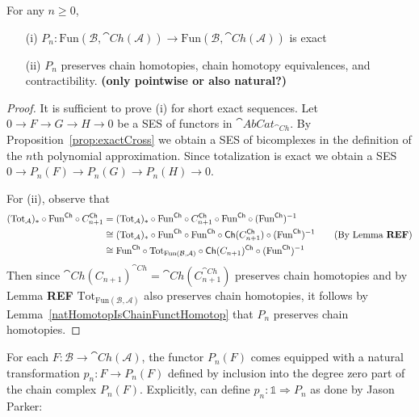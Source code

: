 \begin{prop}[label=prop:exactPol]
    For any $n \geq 0$,
    \begin{itemize}
        \item[(i)] $P_n:\text{Fun}(\mathcal{B},\cat{Ch}(\mathcal{A}))\rightarrow \text{Fun}(\mathcal{B},\cat{Ch}(\mathcal{A}))$ is exact
        \item[(ii)] $P_n$ preserves chain homotopies, chain homotopy equivalences, and contractibility. \textbf{(only pointwise or also natural?)}
    \end{itemize}
\end{prop}
\begin{proof}
    It is sufficient to prove (i) for short exact sequences. Let $0 \rightarrow F\rightarrow G\rightarrow H\rightarrow 0$ be a SES of functors in $\cat{AbCat}_{\cat{Ch}}$. By Proposition~\ref{prop:exactCross} we obtain a SES of bicomplexes in the definition of the $n$th polynomial approximation. Since totalization is exact we obtain a SES $0 \rightarrow P_n(F)\rightarrow P_n(G)\rightarrow P_n(H)\rightarrow 0$. 
    
    \vspace{10pt}
    
    For (ii), observe that
    \begin{align*}
        (\text{Tot}_{\mathcal{A}})_*\circ \text{Fun}^{\cat{Ch}}\circ C_{n+1}^{\cat{Ch}} &= (\text{Tot}_{\mathcal{A}})_*\circ \text{Fun}^{\cat{Ch}}\circ C_{n+1}^{\cat{Ch}} \circ \text{Fun}^{\cat{Ch}} \circ (\text{Fun}^{\cat{Ch}})^{-1} \\
        &\cong (\text{Tot}_{\mathcal{A}})_*\circ \text{Fun}^{\cat{Ch}}\circ \text{Fun}^{\cat{Ch}} \circ \cat{Ch}(C_{n+1}^{\cat{Ch}})  \circ (\text{Fun}^{\cat{Ch}})^{-1} \tag{By Lemma \textbf{REF}} \\
        &\cong \text{Fun}^{\cat{Ch}}\circ \text{Tot}_{\text{Fun}(\mathcal{B},\mathcal{A})}\circ \cat{Ch}(C_{n+1})^{\cat{Ch}}\circ (\text{Fun}^{\cat{Ch}})^{-1}
    \end{align*}
    Then since $\cat{Ch}(C_{n+1})^{\cat{Ch}}=\cat{Ch}(C_{n+1}^{\cat{Ch}})$ preserves chain homotopies and by Lemma \textbf{REF} $\text{Tot}_{\text{Fun}(\mathcal{B},\mathcal{A})}$ also preserves chain homotopies, it follows by Lemma~\ref{natHomotopIsChainFunctHomotop} that $P_n$ preserves  chain homotopies. 
\end{proof}

For each $F:\mathcal{B}\rightarrow \cat{Ch}(\mathcal{A})$, the functor $P_n(F)$ comes equipped with a natural transformation $p_n:F\rightarrow P_n(F)$ defined by inclusion into the degree zero part of the chain complex $P_n(F)$. Explicitly, can define $p_n:\mathbb{1}\Rightarrow P_n$ as done by Jason Parker:

